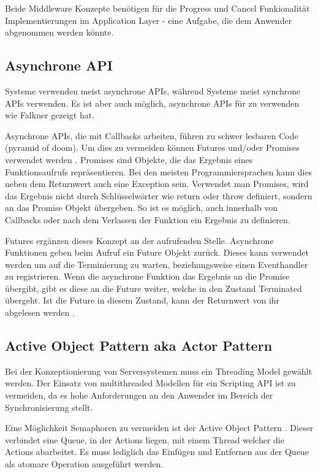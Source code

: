Beide Middleware Konzepte benötigen für die Progress und Cancel Funkionalität Implementierungen im Application Layer - eine Aufgabe, die dem Anwender abgenommen werden könnte.




\subsection{Asynchrone API}
\mom{} Systeme verwenden meist asynchrone APIs, während \rpc{} Systeme meist synchrone APIs verwenden.
Es ist aber auch möglich, asynchrone APIs für \rpc{} zu verwenden wie Falkner \cite{falkner1999implementing} gezeigt hat.

\label{future}
Asynchrone APIs, die mit Callbacks arbeiten, führen zu schwer lesbaren Code (pyramid of doom).
Um dies zu vermeiden können Futures und/oder Promises verwendet werden \cite{baker1977incremental}.
Promises sind Objekte, die das Ergebnis eines Funktionsaufrufs repräsentieren.
Bei den meisten Programmiersprachen kann dies neben dem Returnwert auch eine Exception sein.
Verwendet man Promises, wird das Ergebnis nicht durch Schlüsselwörter wie return oder throw definiert, sondern an das Promise Objekt übergeben.
So ist es möglich, auch innerhalb von Callbacks oder nach dem Verlassen der Funktion ein Ergebnis zu definieren.

Futures ergänzen dieses Konzept an der aufrufenden Stelle.
Asynchrone Funktionen geben beim Aufruf ein Future Objekt zurück.
Dieses kann verwendet werden um auf die Terminierung zu warten, beziehungsweise einen Eventhandler zu registrieren.
Wenn die asynchrone Funktion das Ergebnis an die Promise übergibt, gibt es diese an die Future weiter, welche in den Zustand Terminated übergeht.
Ist die Future in diesem Zustand, kann der Returnwert von ihr abgelesen werden \cite{baker1977incremental}.



\subsection{Active Object Pattern aka Actor Pattern}
Bei der Konzeptionierung von Serversystemen muss ein Threading Model gewählt werden.
Der Einsatz von multithreaded Modellen für ein Scripting API ist zu vermeiden, da es hohe Anforderungen an den Anwender im Bereich der Synchronisierung stellt.

Eine Möglichkeit Semaphoren zu vermeiden ist der Active Object Pattern \cite{schmidt2013pattern}.
Dieser verbindet eine Queue, in der Actions liegen, mit einem Thread welcher die Actions abarbeitet.
Es muss lediglich das Einfügen und Entfernen aus der Queue als atomare Operation ausgeführt werden.




